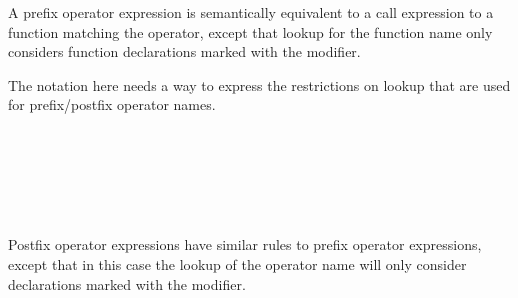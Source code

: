 \begin{Description}
A prefix operator expression is semantically equivalent to a call expression to a function matching the operator, except that lookup for the function name only considers function declarations marked with the  modifier.
\end{Description}

\begin{Incomplete}
The notation here needs a way to express the restrictions on lookup that are used for prefix/postfix operator names.
\end{Incomplete}


\begin{Syntax}
	 \\
         

     \\
        \SynOr \code{++}  \\
        \SynOr \code{--}  \\
\end{Syntax}

\begin{Checking}

\end{Checking}

\begin{Description}
Postfix operator expressions have similar rules to prefix operator expressions, except that in this case the lookup of the operator name will only consider declarations marked with the  modifier.
\end{Description}


